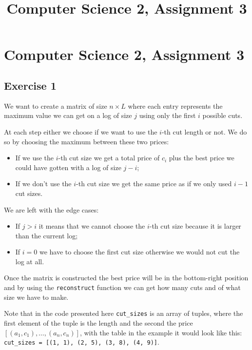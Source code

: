 \documentclass[12pt]{extarticle}
\title{Computer Science 2, Assignment 3}
\begin{document}
\section*{Computer Science 2, Assignment 3}

\subsection*{Exercise 1}

We want to create a matrix of size $n \times L$ where each entry represents the maximum value we can get on a log of size $j$ using only the first $i$ possible cuts.

At each step either we choose if we want to use the $i$-th cut length or not.
We do so by choosing the maximum between these two prices:
\begin{itemize}
    \item If we use the $i$-th cut size we get a total price of $c_i$ plus the best price we could have gotten with a log of size $j-i$;
    \item If we don't use the $i$-th cut size we get the same price as if we only used $i-1$ cut sizes.
\end{itemize}

We are left with the edge cases:
\begin{itemize}
    \item If $j > i$ it means that we cannot choose the $i$-th cut size because it is larger than the current log;
    \item If $i = 0$ we have to choose the first cut size otherwise we would not cut the log at all.
\end{itemize}

Once the matrix is constructed the best price will be in the bottom-right position and by using the \texttt{reconstruct} function we can get how many cuts and of what size we have to make.

Note that in the code presented here \texttt{cut\_sizes}
is an array of tuples, where the first element of the tuple is the length and the second the price
$[(a_1, c_1), \ldots, (a_n, c_n)]$, with the table in the example it would look like this:
\texttt{cut\_sizes = [(1, 1), (2, 5), (3, 8), (4, 9)]}.
\end{document}
